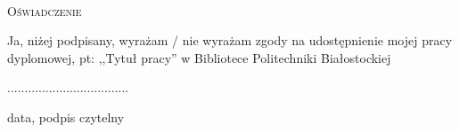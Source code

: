 \documentclass[magisterium,oneside,10pt]{wipb}
\begin{document}

\maketitle

\tableofcontents
\thispagestyle{empty}

\setcounter{page}{0}





\lstlistoflistings
\thispagestyle{empty}

\listoffigures
\listoftables

\pagebreak
\pagestyle{empty}
~\\ \vspace{2cm}
\begin{center}
{\Large    \textsc{Oświadczenie}}
\end{center}
\vspace{2cm}
Ja, niżej podpisany, wyrażam / nie wyrażam zgody na udostępnienie mojej pracy dyplomowej,  pt: ,,Tytuł  pracy''
w Bibliotece  Politechniki Białostockiej



\begin{flushright}
...................................

data,  podpis czytelny 
\end{flushright}
\end{document}
